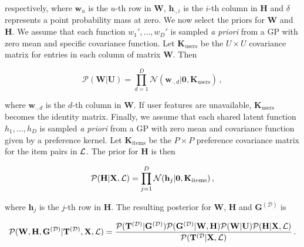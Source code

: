 \vspace{-0.575cm}
\normalsize respectively, where $\mathbf{w}_u$ is the $u$-th row in $\mathbf{W}$, $\mathbf{h}_{\cdot,i}$ is the $i$-th column in $\mathbf{H}$
and $\delta$ represents a point probability mass at zero.
We now select the priors for $\mathbf{W}$ and $\mathbf{H}$. 
We assume that each function $w_1',\ldots,w_D'$ is sampled \textit{a priori} from a GP
with zero mean and specific covariance function. Let $\mathbf{K}_\text{users}$ be the $U \times U$ 
covariance matrix for entries in each column of matrix $\mathbf{W}$. Then

\vspace{-0.55cm}
{\small
\begin{equation}
\mathcal{P}(\mathbf{W}|\mathbf{U})=  
\prod_{d=1}^D \mathcal{N}(\mathbf{w}_{\cdot,d}|\mathbf{0},\mathbf{K}_\text{users})\,,\label{eq:priorW}
\end{equation}
}

\vspace{-0.45cm}
\normalsize where $\mathbf{w}_{\cdot,d}$ is the $d$-th column in $\mathbf{W}$.
If user features are unavailable, $\mathbf{K}_\text{users}$ becomes the identity matrix.
Finally, we assume that each shared latent function $h_1,\ldots,h_D$ is sampled \textit{a priori} from a GP
with zero mean and covariance function given by a preference kernel. 
Let $\mathbf{K}_\text{items}$ be the $P \times P$ preference covariance 
matrix for the item pairs in $\mathcal{L}$. The prior for $\mathbf{H}$ is then 

\vspace{-0.55cm}
{\small
\begin{equation}
\mathcal{P}(\mathbf{H}|\mathbf{X},\mathcal{L}) = 
\prod_{j=1}^{D}\mathcal{N}(\mathbf{h}_j|\mathbf{0},\mathbf{K}_\text{items})\,,\label{eq:priorH}
\end{equation}
}

\vspace{-0.45cm}
\normalsize where $\mathbf{h}_j$ is the $j$-th row in $\mathbf{H}$. The resulting posterior for $\mathbf{W}$, $\mathbf{H}$ and $\mathbf{G}^{(\mathcal{D})}$ is

\vspace{-0.45cm}
{\small
\begin{equation}
\mathcal{P}(\mathbf{W},\mathbf{H},\mathbf{G}^{(\mathcal{D})}|\mathbf{T}^{(\mathcal{D})},\mathbf{X},\mathcal{L}) =
\frac{\mathcal{P}(\mathbf{T}^{(\mathcal{D})}|\mathbf{G}^{(\mathcal{D})})
\mathcal{P}(\mathbf{G}^{(\mathcal{D})}|\mathbf{W},\mathbf{H})\mathcal{P}(\mathbf{W}|\mathbf{U})\mathcal{P}(\mathbf{H}|\mathbf{X},\mathcal{L})} 
{\mathcal{P}(\mathbf{T}^{(\mathcal{D}}|\mathbf{X},\mathcal{L})}\,.\label{eq:post}
\end{equation}
}

